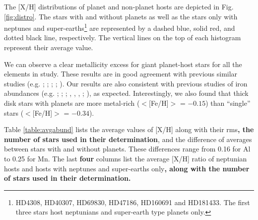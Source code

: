 \documentclass[oldversion]{aa}
\begin{document}
The [X/H] distributions of planet and non-planet hosts are depicted in Fig. \ref{fig:distro}. The stars with and without planets as well as the stars only with neptunes and super-earths\footnote{HD4308, HD40307, HD69830, HD47186, HD160691 and HD181433. The first three stars host neptunians and super-earth type planets only.} are represented by a dashed blue, solid red, and dotted black line, respectively. The vertical lines on the top of each histogram represent their average value. %



We can observe a clear metallicity excess for giant planet-host stars for all the elements in study. These results are in good agreement with previous similar studies (e.g. \citeauthor{Bodaghee-2003} \citeyear{Bodaghee-2003}; \citeauthor{Beirao-2005} \citeyear{Beirao-2005}; \citeauthor{Gilli-2006} \citeyear{Gilli-2006}; \citeauthor{Bond-2006} \citeyear{Bond-2006}; \citeauthor{Takeda-2007} \citeyear{Takeda-2007}). Our results are also consistent with previous studies of iron abundances (e.g. \citeauthor{Gonzalez-1998} \citeyear{Gonzalez-1998}; \citeauthor{Gonzalez-2001} \citeyear{Gonzalez-2001}; \citeauthor{Laws-2003} \citeyear{Laws-2003}; \citeauthor{Santos-2001a} \citeyear{Santos-2001a}, \citeyear{Santos-2003}, \citeyear{Santos-2004b}, \citeyear{Santos-2005a}; \citeauthor{Fischer-2005} \citeyear{Fischer-2005}), as expected. Interestingly, we also found that thick disk stars with planets are more metal-rich  ($<$[Fe/H]$>$ = $-0.15$) than ``single'' stars ($<$[Fe/H]$>$ = $-0.34$).


Table \ref{table:avgabund} lists the average values of [X/H] along with their rms\textbf{, the number of stars used in their determination}, and the difference of averages between stars with and without planets. These differences range from 0.16 for Al to 0.25 for Mn. The last \textbf{four} columns list the average [X/H] ratio of neptunian hosts and hosts with neptunes and super-earths only\textbf{, along with the number of stars used in their determination.}   %
\end{document}
